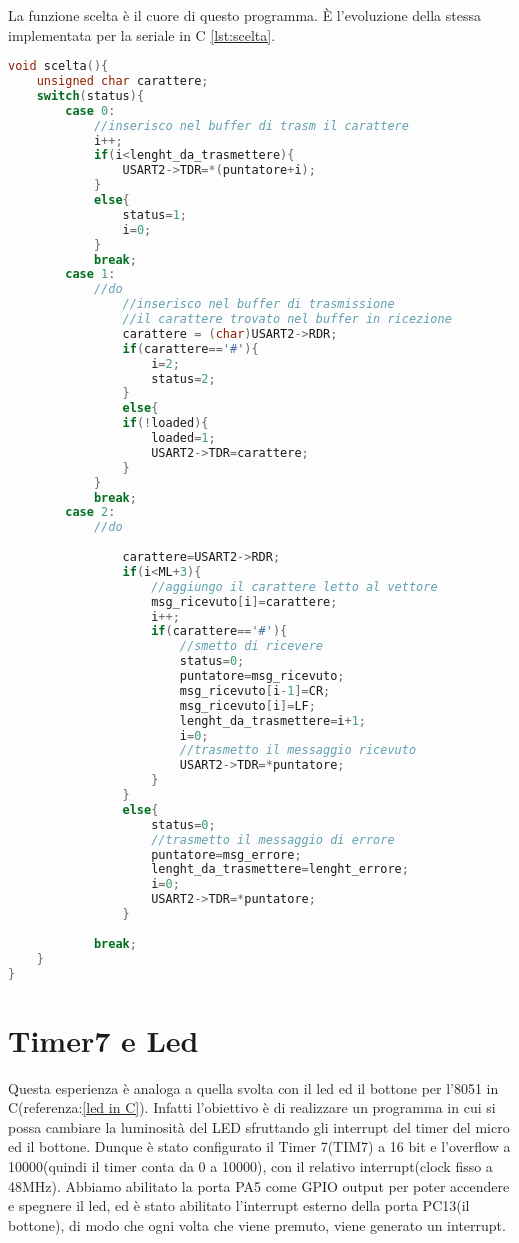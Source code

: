 \documentclass[main.tex]{subfiles}
\begin{document}
La funzione scelta è il cuore di questo programma. È l'evoluzione della stessa implementata per la seriale in C \ref{lst:scelta}.
\begin{lstlisting}[language=C,caption=Funzione scelta,label={lst:scelta_due}]
void scelta(){
	unsigned char carattere;
	switch(status){
		case 0:
			//inserisco nel buffer di trasm il carattere
			i++;
			if(i<lenght_da_trasmettere){
				USART2->TDR=*(puntatore+i);
			}
			else{
				status=1;
				i=0;
			}
			break;
		case 1:
			//do
				//inserisco nel buffer di trasmissione
				//il carattere trovato nel buffer in ricezione
				carattere = (char)USART2->RDR;
				if(carattere=='#'){
					i=2;
					status=2;
				}
				else{
				if(!loaded){
					loaded=1;
					USART2->TDR=carattere;
				}
			}
			break;
		case 2:
			//do
				
				carattere=USART2->RDR;
				if(i<ML+3){
					//aggiungo il carattere letto al vettore
					msg_ricevuto[i]=carattere;
					i++;
					if(carattere=='#'){
						//smetto di ricevere
						status=0;
						puntatore=msg_ricevuto;
						msg_ricevuto[i-1]=CR;
						msg_ricevuto[i]=LF;
						lenght_da_trasmettere=i+1;
						i=0;
						//trasmetto il messaggio ricevuto
						USART2->TDR=*puntatore;
					}
				}
				else{
					status=0;
					//trasmetto il messaggio di errore
					puntatore=msg_errore;
					lenght_da_trasmettere=lenght_errore;
					i=0;
					USART2->TDR=*puntatore;
				}
			
			break;
	}
}
\end{lstlisting}

\section{Timer7 e Led}

Questa esperienza è analoga a quella svolta con il led ed il bottone per l'8051 in C(referenza:\ref{led in C}). Infatti l'obiettivo è di realizzare un programma in cui si possa cambiare la luminosità del LED sfruttando gli interrupt del timer del micro ed il bottone. Dunque è stato configurato il Timer 7(TIM7) a 16 bit e l'overflow a 10000(quindi il timer conta da 0 a 10000), con il relativo interrupt(clock fisso a 48MHz). Abbiamo abilitato la porta PA5 come GPIO output per poter accendere e spegnere il led, ed è stato abilitato l'interrupt esterno della porta PC13(il bottone), di modo che ogni volta che viene premuto, viene generato un interrupt.
\end{document}
